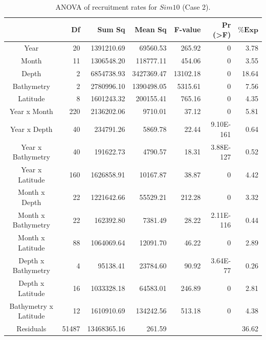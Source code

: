 \begin{table}[H]
\centering
\begin{adjustbox}{width=0.9\textwidth}
\small
\begin{tabular}{c|r|r|r|r|r|r}
\hline
                                  &
	\textbf{Df}                   &
	\textbf{Sum Sq}               &
	\textbf{Mean Sq}              &
	\textbf{F-value}    		   &
	\textbf{Pr (\textgreater{F})} &
	$\mathbf{\% Exp}$      \\
\hline
Year                  & 20    & 1391210.69  & 69560.53   & 265.92   & 0                   & 3.78  \\
Month                 & 11    & 1306548.20  & 118777.11  & 454.06   & 0                   & 3.55  \\
Depth                 & 2     & 6854738.93  & 3427369.47 & 13102.18 & 0                   & 18.64 \\
Bathymetry            & 2     & 2780996.10  & 1390498.05 & 5315.61  & 0                   & 7.56  \\
Latitude              & 8     & 1601243.32  & 200155.41  & 765.16   & 0                   & 4.35  \\
Year x Month          & 220   & 2136202.06  & 9710.01    & 37.12    & 0                   & 5.81  \\
Year x Depth          & 40    & 234791.26   & 5869.78    & 22.44    & 9.10E-161           & 0.64  \\
Year x Bathymetry     & 40    & 191622.73   & 4790.57    & 18.31    & 3.88E-127           & 0.52  \\
Year x Latitude       & 160   & 1626858.91  & 10167.87   & 38.87    & 0                   & 4.42  \\
Month x Depth         & 22    & 1221642.66  & 55529.21   & 212.28   & 0                   & 3.32  \\
Month x Bathymetry    & 22    & 162392.80   & 7381.49    & 28.22    & 2.11E-116           & 0.44  \\
Month x Latitude      & 88    & 1064069.64  & 12091.70   & 46.22    & 0                   & 2.89  \\
Depth x Bathymetry    & 4     & 95138.41    & 23784.60   & 90.92    & 3.64E-77            & 0.26  \\
Depth x Latitude      & 16    & 1033328.18  & 64583.01   & 246.89   & 0                   & 2.81  \\
Bathymetry x Latitude & 12    & 1610910.69  & 134242.56  & 513.18   & 0                   & 4.38  \\
Residuals             & 51487 & 13468365.16 & 261.59     &          &                     & 36.62 \\
\hline
\end{tabular}
\end{adjustbox}
\caption{ANOVA of recruitment rates for $Sim 10$ (Case 2).}
\label{ANOVAsim10}
\end{table}

